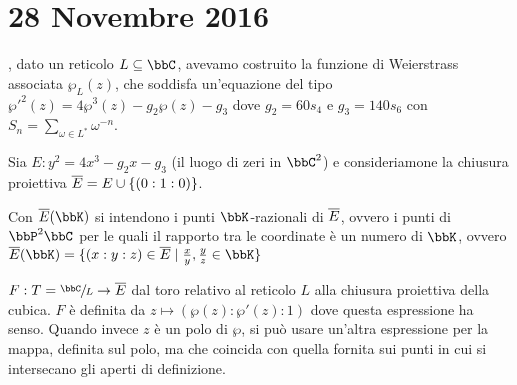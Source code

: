 \chapter{28 Novembre 2016}
\justify

, dato un reticolo $L \subseteq \bbC$, avevamo
costruito la funzione di Weierstrass associata $\wp_L (z)$, che soddisfa
un'equazione del tipo $\wp'^2(z) = 4 \wp^3(z) - g_2 \wp(z) - g_3$ dove
$g_2 = 60 s_4$ e $g_3 = 140 s_6$ con $S_n = \sum_{\omega \in L^*}
\omega^{-n}$.

Sia $E: y^2 = 4x^3 - g_2 x - g_3$ (il luogo di zeri in $\bbC^2$) e
consideriamone la chiusura proiettiva $\overline{E} = E \cup \{ (0 : 1 : 0)
\}$.

\begin{notazione}
  Con $\ol{E}(\bbK)$ si intendono i punti $\bbK$-razionali di $\overline{E}$,
  ovvero i punti di $\bbP^2 \bbC$ per le quali il rapporto tra le
  coordinate è un numero di $\bbK$, ovvero
  $\ol{E}(\bbK) = \{ (x : y : z) \in \ol{E} \mid \frac{x}{y},
  \frac{y}{z} \in \bbK \}$
\end{notazione}

 $F: T = \sfrac{\bbC}{L} \rar \ol{E}$
dal toro relativo al reticolo $L$ alla chiusura proiettiva della
cubica. $F$ è definita da $z \mapsto (\wp(z) : \wp'(z) : 1)$ dove questa
espressione ha senso. Quando invece $z$ è un polo di $\wp$, si può usare
un'altra espressione per la mappa, definita sul polo, ma che coincida
con quella fornita sui punti in cui si intersecano gli aperti di
definizione.


